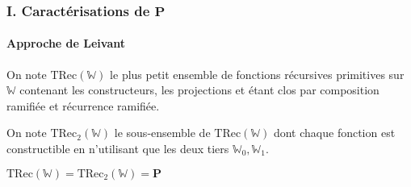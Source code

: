 \documentclass[10pt]{beamer}
\newcommand{\bbW}{\mathbb{W}}
\newcommand{\TRec}[1]{\text{TRec}\left(\mathbb{#1}\right)}
\newcommand{\TRecd}[1]{\text{TRec}_{2}\left(\mathbb{#1}\right)}
\begin{document}
	
	\begin{frame}
		\frametitle{I. Caractérisations de $\textbf{P}$}
		\framesubtitle{Approche de Leivant}
		
		\begin{defn}
			On note $\TRec{W}$ le plus petit ensemble de fonctions récursives primitives sur $\bbW$ contenant les constructeurs, les projections et étant clos par composition ramifiée et récurrence ramifiée.
			
			On note $\TRecd{W}$ le sous-ensemble de $\TRec{W}$ dont chaque fonction est constructible en n'utilisant que les deux tiers $\bbW_0, \bbW_1$.
		\end{defn}
		
		
		\begin{thm}
			$\TRec{W} = \TRecd{W} = \textbf{P}$
		\end{thm}
	\end{frame}
\end{document}
